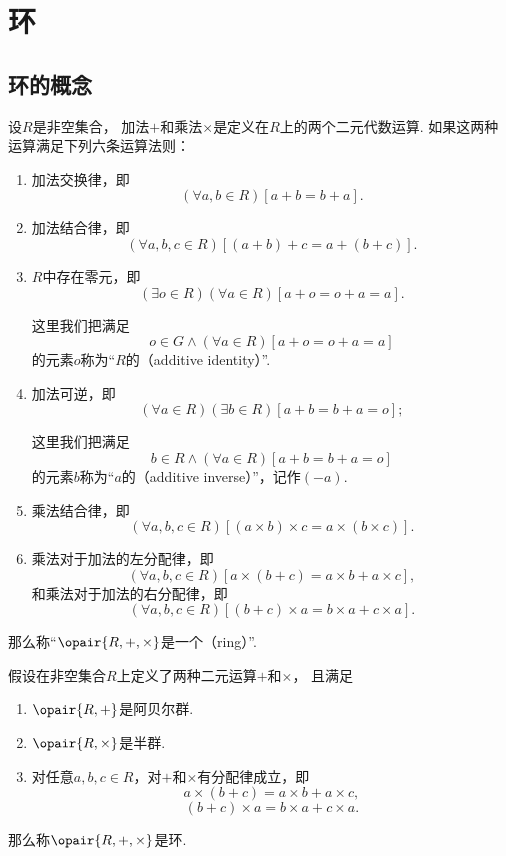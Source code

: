 \section{环}
\subsection{环的概念}
\begin{definition}\label{definition:抽象代数.环的定义}
设\(R\)是非空集合，
加法\(+\)和乘法\(\times\)是定义在\(R\)上的两个二元代数运算.
如果这两种运算满足下列六条运算法则：
\begin{enumerate}
	\item 加法交换律，即\[
		(\forall a,b \in R)[a+b = b+a].
	\]

	\item 加法结合律，即\[
		(\forall a,b,c \in R)[(a+b)+c = a+(b+c)].
	\]

	\item \(R\)中存在零元，即\[
		(\exists o \in R)(\forall a \in R)[a+o = o+a = a].
	\]

	这里我们把满足\[
		o \in G
		\land
		(\forall a \in R)[a+o = o+a = a]
	\]的元素\(o\)称为“\(R\)的（additive identity）”.

	\item 加法可逆，即\[
		(\forall a \in R)(\exists b \in R)[a+b = b+a = o];
	\]

	这里我们把满足\[
		b \in R
		\land
		(\forall a \in R)[a+b = b+a = o]
	\]的元素\(b\)称为“\(a\)的（additive inverse）”，记作\((-a)\).

	\item 乘法结合律，即\[
		(\forall a,b,c \in R)
		[ (a \times b) \times c = a \times (b \times c) ].
	\]

	\item 乘法对于加法的左分配律，即\[
		(\forall a,b,c \in R)[ a \times (b+c) = a \times b + a \times c ],
	\]
	和乘法对于加法的右分配律，即\[
		(\forall a,b,c \in R)[ (b+c) \times a = b \times a + c \times a ].
	\]
\end{enumerate}
那么称“\(\opair{R,+,\times}\)是一个（ring）”.
\end{definition}

\begin{theorem}
假设在非空集合\(R\)上定义了两种二元运算\(+\)和\(\times\)，
且满足\begin{enumerate}
	\item \(\opair{R,+}\)是阿贝尔群.

	\item \(\opair{R,\times}\)是半群.

	\item 对任意\(a,b,c \in R\)，对\(+\)和\(\times\)有分配律成立，即\[
		a \times (b + c) = a \times b + a \times c,
	\]\[
		(b + c) \times a = b \times a + c \times a.
	\]
\end{enumerate}
那么称\(\opair{R,+,\times}\)是环.
\end{theorem}

